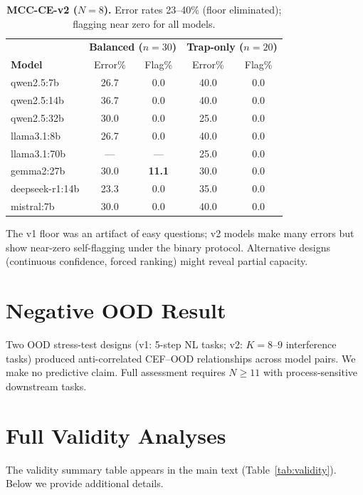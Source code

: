 \documentclass{article}
\begin{document}
\begin{table}[h]
\centering
\small
\caption{\textbf{MCC-CE-v2 ($N{=}8$).} Error rates 23--40\% (floor
eliminated); flagging near zero for all models.}
\label{tab:mcc_v2}
\begin{tabular}{lcc|cc}
\toprule
& \multicolumn{2}{c|}{\textbf{Balanced ($n{=}30$)}} & \multicolumn{2}{c}{\textbf{Trap-only ($n{=}20$)}} \\
\textbf{Model} & Error\% & Flag\% & Error\% & Flag\% \\
\midrule
qwen2.5:7b      & 26.7 & 0.0 & 40.0 & 0.0 \\
qwen2.5:14b     & 36.7 & 0.0 & 40.0 & 0.0 \\
qwen2.5:32b     & 30.0 & 0.0 & 25.0 & 0.0 \\
llama3.1:8b     & 26.7 & 0.0 & 40.0 & 0.0 \\
llama3.1:70b    & ---  & --- & 25.0 & 0.0 \\
gemma2:27b      & 30.0 & \textbf{11.1} & 30.0 & 0.0 \\
deepseek-r1:14b & 23.3 & 0.0 & 35.0 & 0.0 \\
mistral:7b      & 30.0 & 0.0 & 40.0 & 0.0 \\
\bottomrule
\end{tabular}
\end{table}

The v1 floor was an artifact of easy questions; v2 models make many
errors but show near-zero self-flagging under the binary protocol.
Alternative designs (continuous confidence, forced ranking) might reveal
partial capacity.

\section{Negative OOD Result}
\label{app:ood}

Two OOD stress-test designs (v1: 5-step NL tasks; v2: $K{=}8$--$9$
interference tasks) produced anti-correlated CEF--OOD relationships
across model pairs. We make no predictive claim. Full assessment requires
$N \geq 11$ with process-sensitive downstream tasks.

\section{Full Validity Analyses}
\label{app:validity}

The validity summary table appears in the main text
(Table~\ref{tab:validity}). Below we provide additional details.
\end{document}
